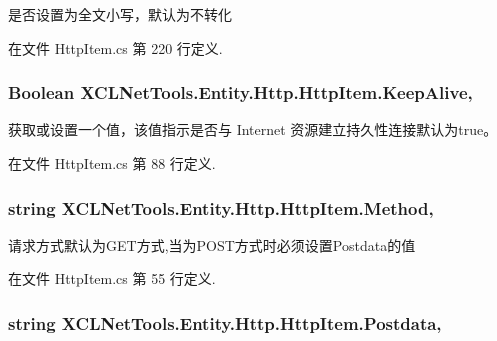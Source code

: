 是否设置为全文小写，默认为不转化 



在文件 Http\-Item.\-cs 第 220 行定义.

\hypertarget{class_x_c_l_net_tools_1_1_entity_1_1_http_1_1_http_item_ab28dbd38f5c220a2a59193f6a69c34e2}{
\subsubsection[{Keep\-Alive}]{\setlength{\rightskip}{0pt plus 5cm}Boolean X\-C\-L\-Net\-Tools.\-Entity.\-Http.\-Http\-Item.\-Keep\-Alive\hspace{0.3cm}{\ttfamily [get]}, {\ttfamily [set]}}}\label{class_x_c_l_net_tools_1_1_entity_1_1_http_1_1_http_item_ab28dbd38f5c220a2a59193f6a69c34e2}


获取或设置一个值，该值指示是否与 Internet 资源建立持久性连接默认为true。 



在文件 Http\-Item.\-cs 第 88 行定义.

\hypertarget{class_x_c_l_net_tools_1_1_entity_1_1_http_1_1_http_item_a4c675d85e9d3864e5c5ad04c4a4ae3cd}{
\subsubsection[{Method}]{\setlength{\rightskip}{0pt plus 5cm}string X\-C\-L\-Net\-Tools.\-Entity.\-Http.\-Http\-Item.\-Method\hspace{0.3cm}{\ttfamily [get]}, {\ttfamily [set]}}}\label{class_x_c_l_net_tools_1_1_entity_1_1_http_1_1_http_item_a4c675d85e9d3864e5c5ad04c4a4ae3cd}


请求方式默认为\-G\-E\-T方式,当为\-P\-O\-S\-T方式时必须设置\-Postdata的值 



在文件 Http\-Item.\-cs 第 55 行定义.

\hypertarget{class_x_c_l_net_tools_1_1_entity_1_1_http_1_1_http_item_a9151cc1e4067ca0b035052ee0a8b3de9}{
\subsubsection[{Postdata}]{\setlength{\rightskip}{0pt plus 5cm}string X\-C\-L\-Net\-Tools.\-Entity.\-Http.\-Http\-Item.\-Postdata\hspace{0.3cm}{\ttfamily [get]}, {\ttfamily [set]}}}\label{class_x_c_l_net_tools_1_1_entity_1_1_http_1_1_http_item_a9151cc1e4067ca0b035052ee0a8b3de9}


